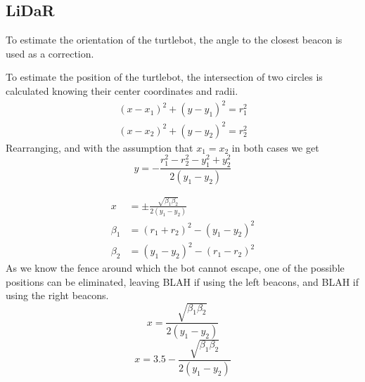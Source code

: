 \documentclass{ieeeaccess}
\begin{document}
\subsection{LiDaR}
	To estimate the orientation of the turtlebot, the angle to the closest beacon is used as a correction.
	
	To estimate the position of the turtlebot, the intersection of two circles is calculated knowing their center coordinates and radii.
	\begin{equation}
	\begin{aligned}
		\left(x-x_{1}\right)^{2} + \left(y-y_{1}\right)^{2}=r_{1}^{2}	\\
		\left(x-x_{2}\right)^{2} + \left(y-y_{2}\right)^{2}=r_{2}^{2}
	\end{aligned}
	\end{equation}
	Rearranging, and with the assumption that $x_{1}=x_{2}$  in both cases we get
	\begin{equation}
		y = -\frac{r_{1}^{2}-r_{2}^{2}-y_{1}^{2}+y_{2}^{2}}{2\left(y_{1}-y_{2}\right)}
	\end{equation}
	
	\begin{equation}
	\begin{aligned}
		x 		&= \pm \frac{\sqrt{\beta_{1}\beta_{2}}}{2\left(y_{1}-y_{2}\right)}	\\
		\beta_{1} 	&= \left(r_{1}+r_{2}\right)^{2}-\left(y_{1}-y_{2}\right)^{2}		\\
		\beta_{2} 	&=\left(y_{1}-y_{2}\right)^{2}-\left(r_{1}-r_{2}\right)^{2}
	\end{aligned}
	\end{equation}
	As we know the fence around which the bot cannot escape, one of the possible positions can be eliminated, leaving BLAH if using the left beacons, and BLAH if using the right beacons.
	\begin{equation}
		x 		= \frac{\sqrt{\beta_{1}\beta_{2}}}{2\left(y_{1}-y_{2}\right)}
	\end{equation}
	\begin{equation}
		x 		= 3.5-\frac{\sqrt{\beta_{1}\beta_{2}}}{2\left(y_{1}-y_{2}\right)}
	\end{equation}
	
\end{document}
